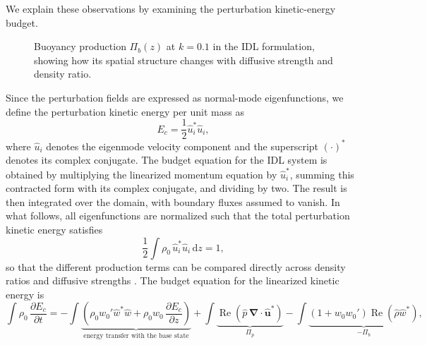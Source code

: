 \documentclass[11pt]{article}
\newcommand{\bnabla}{\boldsymbol{\nabla}}
\newif\ifloadfig
\newcommand{\figfile}[1]{\ifloadfig\fi}
\begin{document}
We explain these observations by examining the perturbation kinetic-energy budget.
\begin{figure}
    \centering
    \begin{minipage}[t]{0.31\textwidth}
        \centering
        \vspace{0pt}
        \figfile{figures/contribution_Pb_Pe40}
    \end{minipage}
    \hfill
    \begin{minipage}[t]{0.31\textwidth}
        \centering
        \vspace{0pt}
        \figfile{figures/contribution_Pb_Pe5}
    \end{minipage}
    \hfill
    \begin{minipage}[t]{0.32\textwidth}
        \centering
        \vspace{0pt}
        \figfile{figures/contribution_Pb_Pe1}
    \end{minipage}
    \caption{Buoyancy production \(\Pi_b(z)\) at \(k=0.1\) in the IDL formulation, showing how its spatial structure changes with diffusive strength and density ratio.}
    \label{fig:contribution_buoyant}
\end{figure}
Since the perturbation fields are expressed as normal-mode eigenfunctions, we define the perturbation kinetic energy per unit mass as
\begin{equation}
    E_c = \frac{1}{2}\hat{u}_i^{*}\hat{u}_i,
\end{equation}
where \(\hat{u}_i\) denotes the eigenmode velocity component and the superscript \((\cdot)^{*}\) denotes its complex conjugate. The budget equation for the IDL system is obtained by multiplying the linearized momentum equation by \(\hat{u}_i^{*}\), summing this contracted form with its complex conjugate, and dividing by two. The result is then integrated over the domain, with boundary fluxes assumed to vanish. In what follows, all eigenfunctions are normalized such that the total perturbation kinetic energy satisfies
\begin{equation}
    \frac{1}{2}\int \rho_0 \, \hat{u}_i^{*}\hat{u}_i \,\mathrm{d}z = 1,
\end{equation}
so that the different production terms can be compared directly across density ratios and diffusive strengths \citep{kirthy-diwan-2020}. The budget equation for the linearized kinetic energy is
\begin{equation}
    \int \rho_0 \, \frac{\partial E_c}{\partial t}
    =
    - \int\underbrace{ \left( \rho_0 w_0' \hat{w}^{*}\hat{w} + \rho_0 w_0 \, \frac{\partial E_c}{\partial z} \right)}_{\text{energy transfer with the base state}}
    + \int\underbrace{ \operatorname{Re}\!\left(\hat{p} \, \bnabla \cdot \hat{\boldsymbol{u}}^{*}\right)}_{\Pi_p}
    - \int\underbrace{ \left( 1 + w_0 w_0' \right) \operatorname{Re}\!\left(\hat{\rho}\hat{w}^{*}\right)}_{-\Pi_b},
\end{equation}
\end{document}
